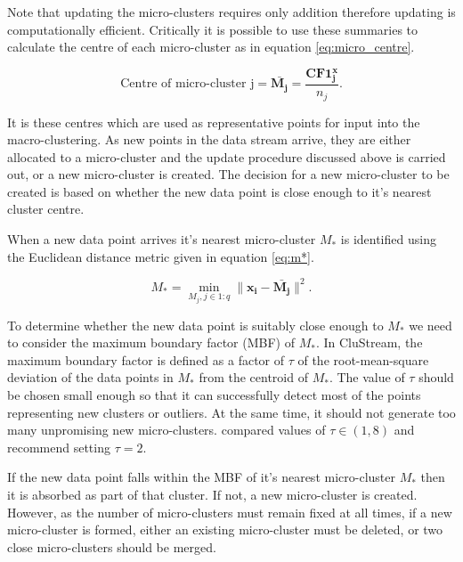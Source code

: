 Note that updating the micro-clusters requires only addition therefore updating is computationally efficient. Critically it is possible to use these summaries to calculate the centre of each micro-cluster as in equation \eqref{eq:micro_centre}.

\begin{equation}
  \label{eq:micro_centre}
  \text{Centre of micro-cluster j}  = \boldsymbol{\bar{M_j}} = \frac{\boldsymbol{CF1^x_j}}{n_j}.
\end{equation}

It is these centres which are used as representative points for input into the macro-clustering.  As new points in the data stream arrive, they are either allocated to a micro-cluster and the update procedure discussed above is carried out, or a new micro-cluster is created. The decision for a new micro-cluster to be created is based on whether the new data point is close enough to it's nearest cluster centre. 

When a new data point arrives it's nearest micro-cluster $M_{*}$ is identified using the Euclidean distance metric given in equation \eqref{eq:m*}.

\begin{equation}
  \label{eq:m*}
 M_{*} = \min_{M_j , j \in 1:q} \lVert {\boldsymbol{x_i} -\boldsymbol{\bar{M_j}} } \rVert ^2.
\end{equation}

To determine whether the new data point is suitably close enough to  $M_{*}$ we need to consider the maximum boundary factor (MBF) of $M_{*}$. In CluStream, the maximum boundary factor is defined as a factor of $\tau$ of the root-mean-square deviation of the data points in $M_{*}$ from the centroid of $M_{*}$.  The value of $\tau$  should be chosen small enough so that it can successfully detect most of the points representing new clusters or outliers. At the same time, it should not generate too many unpromising new micro-clusters. \cite{Aggarwal2003} compared values of $\tau \in (1,8)$ and recommend setting $\tau = 2$. 

If the new data point falls within the MBF of it's nearest micro-cluster $M_{*}$ then it is absorbed as part of that cluster. If not, a new micro-cluster is created. However, as the number of micro-clusters must remain fixed at all times, if a new micro-cluster is formed, either an existing micro-cluster must be deleted, or two close micro-clusters should be merged.



